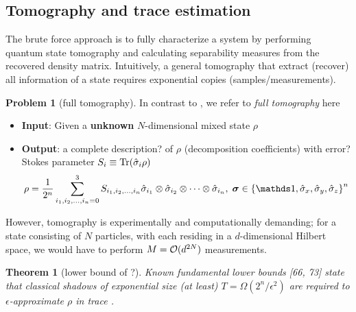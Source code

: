 \documentclass[
10pt,
aps,
pra,
linenumbers,
floatfix,
]{revtex4-2}
\theoremstyle{plain}
\newtheorem{theorem}{Theorem}
\theoremstyle{definition}
\newtheorem{problem}{Problem}
\newcommand{\dm}{\rho}
\begin{document}
\subsection{Tomography and trace estimation}
The brute force approach is to fully characterize a system by performing quantum state tomography and calculating separability measures from the recovered density matrix.
Intuitively, a general tomography \cite{altepeterPhotonicStateTomography2005} that extract (recover) all information of a state requires exponential copies (samples/measurements).
\begin{problem}[full tomography]\label{prm:full_tomography}
	In contrast to , we refer to \emph{full tomography} here
	\begin{itemize}
		\item \textbf{Input}: Given a \textbf{unknown} $N$-dimensional mixed state $\dm$
		\item \textbf{Output}: a complete description? of $\dm$ (decomposition coefficients) with error?
		Stokes parameter $S_i\equiv \Tr(\hat{\sigma}_i \dm)$
		\begin{equation}\label{eq:stokes_tomography}
			\dm = \frac{1}{2^n} \sum_{i_1,i_2,\dots,i_n=0}^3
			S_{i_1,i_2,\dots,i_n} 
			\hat{\sigma}_{i_1} \otimes \hat{\sigma}_{i_2} \otimes \dots \otimes \hat{\sigma}_{i_n} 
			,\;
			\bm{\sigma}\in \qty{\identity,\sx,\sy,\sz}^n
		\end{equation}
	\end{itemize}
\end{problem}
However, tomography is experimentally and computationally demanding; for a state consisting of $N$ particles, with each residing in a $d$-dimensional Hilbert space, we would have to perform $M = \mathcal{O}(d^{2N})$ measurements.
\begin{theorem}[lower bound of ?\cite{haahSampleoptimalTomographyQuantum2017}]
	Known fundamental lower bounds [66, 73] state that classical shadows of exponential size (at least) $T = \Omega( 2^n / \epsilon^2)$ are required to $\epsilon$-approximate $\dm$ in trace .
\end{theorem}
\end{document}
